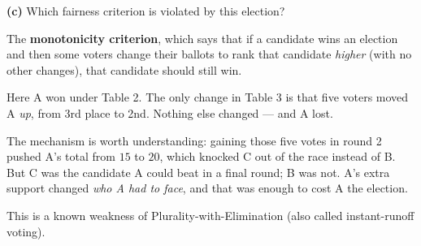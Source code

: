 \documentclass[12pt]{ximera}
\begin{document}
\begin{problem}
\begin{prompt}
\textbf{(c)} Which fairness criterion is violated by this election?

\begin{multipleChoice}
\end{multipleChoice}

\begin{feedback}
The \textbf{monotonicity criterion}, which says that if a candidate wins an election
and then some voters change their ballots to rank that candidate \emph{higher} (with
no other changes), that candidate should still win.

Here A won under Table 2. The only change in Table 3 is that five voters moved A
\emph{up}, from 3rd place to 2nd. Nothing else changed --- and A lost.

The mechanism is worth understanding: gaining those five votes in round 2 pushed A's
total from $15$ to $20$, which knocked C out of the race instead of B. But C was the
candidate A could beat in a final round; B was not. A's extra support changed
\emph{who A had to face}, and that was enough to cost A the election.

This is a known weakness of Plurality-with-Elimination (also called instant-runoff
voting).
\end{feedback}
\end{prompt}
\end{problem}
\end{document}
